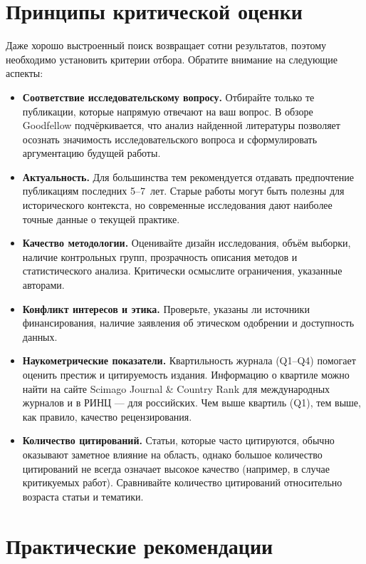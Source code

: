 \documentclass[
  russian,
  letterpaper,
]{book}
\begin{document}
\chapter{Принципы критической оценки}\label{sec-evaluation}

Даже хорошо выстроенный поиск возвращает сотни результатов, поэтому
необходимо установить критерии отбора. Обратите внимание на следующие
аспекты:

\begin{itemize}
\item
  \textbf{Соответствие исследовательскому вопросу.} Отбирайте только те
  публикации, которые напрямую отвечают на ваш вопрос. В обзоре
  Goodfellow подчёркивается, что анализ найденной литературы позволяет
  осознать значимость исследовательского вопроса и сформулировать
  аргументацию будущей работы.
\item
  \textbf{Актуальность.} Для большинства тем рекомендуется отдавать
  предпочтение публикациям последних 5--7~лет. Старые работы могут быть
  полезны для исторического контекста, но современные исследования дают
  наиболее точные данные о текущей практике.
\item
  \textbf{Качество методологии.} Оценивайте дизайн исследования, объём
  выборки, наличие контрольных групп, прозрачность описания методов и
  статистического анализа. Критически осмыслите ограничения, указанные
  авторами.
\item
  \textbf{Конфликт интересов и этика.} Проверьте, указаны ли источники
  финансирования, наличие заявления об этическом одобрении и доступность
  данных.
\item
  \textbf{Наукометрические показатели.} Квартильность журнала (Q1--Q4)
  помогает оценить престиж и цитируемость издания. Информацию о квартиле
  можно найти на сайте Scimago Journal \& Country Rank для международных
  журналов и в РИНЦ --- для российских. Чем выше квартиль (Q1), тем
  выше, как правило, качество рецензирования.
\item
  \textbf{Количество цитирований.} Статьи, которые часто цитируются,
  обычно оказывают заметное влияние на область, однако большое
  количество цитирований не всегда означает высокое качество (например,
  в случае критикуемых работ). Сравнивайте количество цитирований
  относительно возраста статьи и тематики.
\end{itemize}

\chapter{Практические
рекомендации}\label{ux43fux440ux430ux43aux442ux438ux447ux435ux441ux43aux438ux435-ux440ux435ux43aux43eux43cux435ux43dux434ux430ux446ux438ux438}
\end{document}
